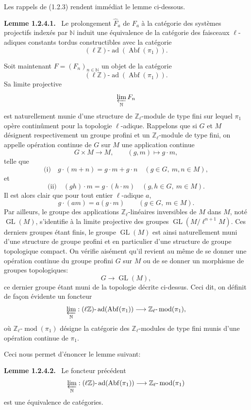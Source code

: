 \documentclass[11pt]{article}
\newenvironment{statement}[1]{\par\medskip\noindent\textbf{#1.}\ }{\par\medskip}
\providecommand{\Abf}{\operatorname{Abf}}
\providecommand{\GL}{\operatorname{GL}}
\providecommand{\ad}{\operatorname{ad}}
\providecommand{\modn}{\operatorname{mod}}
\begin{document}
Les rappels de (1.2.3) rendent immédiat le lemme ci-dessous.

\begin{statement}{Lemme 1.2.4.1}
Le prolongement \(\widehat F_a\) de \(F_a\) à la catégorie des systèmes projectifs indexés par \(\mathbb N\) induit une équivalence de la catégorie des faisceaux \(\ell\)-adiques constants tordus constructibles avec la catégorie
\[
(\ell\mathbb Z)\text{-}\ad(\Abf(\pi_1)).
\]
\end{statement}

Soit maintenant \(F=(F_n)_{n\in\mathbb N}\) un objet de la catégorie
\[
(\ell\mathbb Z)\text{-}\ad(\Abf(\pi_1)).
\]
Sa limite projective
\[
\varprojlim_{\mathbb N}F_n
\]
est naturellement munie d'une structure de \(\mathbb Z_\ell\)-module de type fini sur lequel \(\pi_1\) opère continûment pour la topologie \(\ell\)-adique. Rappelons que si \(G\) et \(M\) désignent respectivement un groupe profini et un \(\mathbb Z_\ell\)-module de type fini, on appelle opération continue de \(G\) sur \(M\) une application continue
\[
G\times M\longrightarrow M,\qquad (g,m)\longmapsto g\cdot m,
\]
telle que
\[
\text{(i)}\quad g\cdot(m+n)=g\cdot m+g\cdot n\quad (g\in G,\ m,n\in M),
\]
et
\[
\text{(ii)}\quad (gh)\cdot m=g\cdot(h\cdot m)\quad (g,h\in G,\ m\in M).
\]
Il est alors clair que pour tout entier \(\ell\)-adique \(a\),
\[
g\cdot(am)=a(g\cdot m)\qquad (g\in G,\ m\in M).
\]
Par ailleurs, le groupe des applications \(\mathbb Z_\ell\)-linéaires inversibles de \(M\) dans \(M\), noté \(\GL(M)\), s'identifie à la limite projective des groupes \(\GL(M/\ell^{n+1}M)\). Ces derniers groupes étant finis, le groupe \(\GL(M)\) est ainsi naturellement muni d'une structure de groupe profini et en particulier d'une structure de groupe topologique compact. On vérifie aisément qu'il revient au même de se donner une opération continue du groupe profini \(G\) sur \(M\) ou de se donner un morphisme de groupes topologiques:
\[
G\longrightarrow \GL(M),
\]
ce dernier groupe étant muni de la topologie décrite ci-dessus. Ceci dit, on définit de façon évidente un foncteur
\[
\varprojlim_{\mathbb N}:(\ell\mathbb Z)\text{-}\ad(\Abf(\pi_1))\longrightarrow
\mathbb Z_\ell\text{-}\modn(\pi_1),
\]
où \(\mathbb Z_\ell\text{-}\modn(\pi_1)\) désigne la catégorie des \(\mathbb Z_\ell\)-modules de type fini munis d'une opération continue de \(\pi_1\).

Ceci nous permet d'énoncer le lemme suivant:

\begin{statement}{Lemme 1.2.4.2}
Le foncteur précédent
\[
\varprojlim_{\mathbb N}:(\ell\mathbb Z)\text{-}\ad(\Abf(\pi_1))
\longrightarrow \mathbb Z_\ell\text{-}\modn(\pi_1)
\]
est une équivalence de catégories.
\end{statement}
\end{document}
